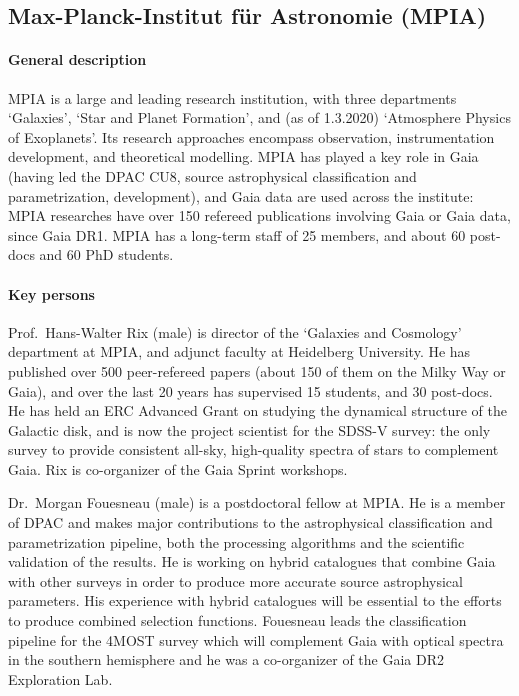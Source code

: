 \subsection{Max-Planck-Institut f\"ur Astronomie (MPIA)}
\label{sec:mpg}

\paragraph{General description}
MPIA is a large and leading research institution, with three departments `Galaxies', `Star and Planet Formation', and (as of 1.3.2020) `Atmosphere Physics of Exoplanets'. Its research approaches encompass observation, instrumentation development, and theoretical modelling. MPIA has played a key role in Gaia (having led the DPAC CU8, source astrophysical classification and parametrization, development), and Gaia data are used across the institute: MPIA researches have over 150 refereed publications involving Gaia or Gaia data, since Gaia DR1. MPIA has a long-term staff of 25 members, and about 60 post-docs and 60 PhD students.

\paragraph{Key persons} 
Prof.~Hans-Walter Rix (male) is director of the `Galaxies and Cosmology' department at MPIA, and adjunct faculty at Heidelberg University. He has published over 500 peer-refereed papers (about 150 of them on the Milky Way or Gaia), and over the last 20 years has supervised 15 students, and 30 post-docs. He has held an ERC Advanced Grant on studying the dynamical structure of the Galactic disk, and is now the project scientist for the SDSS-V survey: the only survey to provide consistent all-sky, high-quality spectra of stars to complement Gaia. Rix is co-organizer of the Gaia Sprint workshops.

Dr.~Morgan Fouesneau (male) is a postdoctoral fellow at MPIA. He is a member of DPAC and makes major contributions to the astrophysical classification and parametrization pipeline, both the processing algorithms and the scientific validation of the results. He is working on hybrid catalogues that combine Gaia with other surveys in order to produce more accurate source astrophysical parameters. His experience with hybrid catalogues will be essential to the efforts to produce combined selection functions. Fouesneau leads the classification pipeline for the 4MOST survey which will complement Gaia with optical spectra in the southern hemisphere and he was a co-organizer of the Gaia DR2 Exploration Lab.

